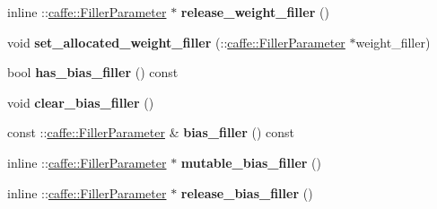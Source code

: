 \begin{DoxyCompactItemize}
\item 
\mbox{\label{classcaffe_1_1_inner_product_parameter_a0162c76a2a9db68fb9224c8541ba4560}} 
inline \+::\mbox{\hyperlink{classcaffe_1_1_filler_parameter}{caffe\+::\+Filler\+Parameter}} $\ast$ {\bfseries release\+\_\+weight\+\_\+filler} ()
\item 
\mbox{\label{classcaffe_1_1_inner_product_parameter_adefb969403f950ed9533efcc2f7a0de8}} 
void {\bfseries set\+\_\+allocated\+\_\+weight\+\_\+filler} (\+::\mbox{\hyperlink{classcaffe_1_1_filler_parameter}{caffe\+::\+Filler\+Parameter}} $\ast$weight\+\_\+filler)
\item 
\mbox{\label{classcaffe_1_1_inner_product_parameter_a51faebf52b95be30f7df6a378c0210bf}} 
bool {\bfseries has\+\_\+bias\+\_\+filler} () const
\item 
\mbox{\label{classcaffe_1_1_inner_product_parameter_a93a47e493536d43ed43f6c5b4358a027}} 
void {\bfseries clear\+\_\+bias\+\_\+filler} ()
\item 
\mbox{\label{classcaffe_1_1_inner_product_parameter_a332464e2741e4f10ec4687bcb1eb9cd1}} 
const \+::\mbox{\hyperlink{classcaffe_1_1_filler_parameter}{caffe\+::\+Filler\+Parameter}} \& {\bfseries bias\+\_\+filler} () const
\item 
\mbox{\label{classcaffe_1_1_inner_product_parameter_aa3c10af2479a3b24ac95f90be839bcd5}} 
inline \+::\mbox{\hyperlink{classcaffe_1_1_filler_parameter}{caffe\+::\+Filler\+Parameter}} $\ast$ {\bfseries mutable\+\_\+bias\+\_\+filler} ()
\item 
\mbox{\label{classcaffe_1_1_inner_product_parameter_abbb38098c2c5175ff340e226373aeb72}} 
inline \+::\mbox{\hyperlink{classcaffe_1_1_filler_parameter}{caffe\+::\+Filler\+Parameter}} $\ast$ {\bfseries release\+\_\+bias\+\_\+filler} ()
\item 
\mbox{\label{classcaffe_1_1_inner_product_parameter_a1f90cac00fd9d0c02b6c782e7bd484ff}} 

\end{DoxyCompactItemize}
